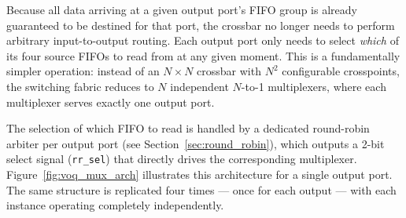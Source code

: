 Because all data arriving at a given output port's FIFO group is already guaranteed to be 
destined for that port, the crossbar no longer needs to perform arbitrary input-to-output 
routing. Each output port only needs to select \emph{which} of its four source FIFOs to 
read from at any given moment. This is a fundamentally simpler operation: instead of an 
$N \times N$ crossbar with $N^2$ configurable crosspoints, the switching fabric reduces to 
$N$ independent $N$-to-1 multiplexers, where each multiplexer serves exactly one output 
port.

The selection of which FIFO to read is handled by a dedicated round-robin arbiter per 
output port (see Section~\ref{sec:round_robin}), which outputs a 2-bit select signal 
(\texttt{rr\_sel}) that directly drives the corresponding multiplexer.
Figure~\ref{fig:voq_mux_arch} illustrates this architecture for a single output port. The 
same structure is replicated four times --- once for each output --- with each instance 
operating completely independently.


